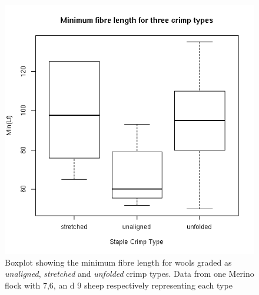 %

\begin{figure}[!h]
  \centering
  \includegraphics[width=1.1\textwidth]{figminlfbox.png}
  \caption{Boxplot showing the minimum  fibre length for wools graded as {\em unaligned}, {\em stretched} and {\em unfolded} crimp types. Data from one Merino flock with 7,6, an d 9 sheep respectively representing each type}
  \label{fig:minlfbox}
\end{figure}

%

